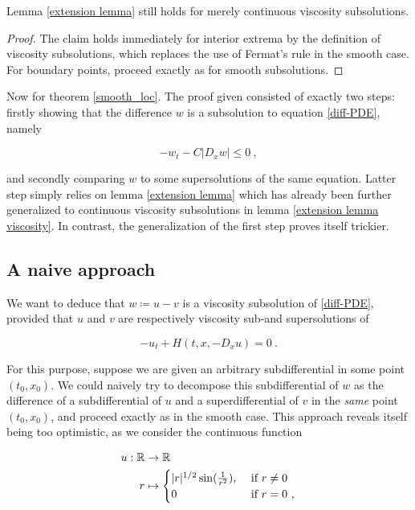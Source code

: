 	\begin{lemma}
		\label{extension lemma viscosity}
		Lemma \ref{extension lemma} still holds for merely continuous viscosity subsolutions.
		
		\begin{proof}
			The claim holds immediately for interior extrema by the definition of viscosity subsolutions, which replaces the use of Fermat's rule in the smooth case. For boundary points, proceed exactly as for smooth subsolutions.
		\end{proof}
	\end{lemma}

	Now for theorem \ref{smooth_loc}. The proof given consisted of exactly two steps: firstly showing that the difference $ w $ is a subsolution to equation \ref{diff-PDE}, namely
	
	\begin{equation*}
		-w_t - C \lvert D_x w \rvert \leq 0 \ ,
	\end{equation*}
	
	and secondly comparing $ w $ to some supersolutions of the same equation. Latter step simply relies on lemma \ref{extension lemma} which has already been further generalized to continuous viscosity subsolutions in lemma \ref{extension lemma viscosity}. In contrast, the generalization of the first step proves itself trickier. 

	\subsection{A naive approach}
		\label{naive}
		
		We want to deduce that $ w \coloneqq u - v $ is a viscosity subsolution of \ref{diff-PDE}, provided that $ u $ and $ v $ are respectively viscosity sub-and supersolutions of
		
		\begin{equation*}
				-u_t + H(t, x, -D_x u) = 0 \ .
		\end{equation*}
		
		For this purpose, suppose we are given an arbitrary subdifferential in some point $ (t_0, x_0) $. We could naively try to decompose this subdifferential of $ w $ as the difference of a subdifferential of $ u $ and a superdifferential of $ v $ in the \emph{same} point $ (t_0, x_0) $, and proceed exactly as in the smooth case. This approach reveals itself being too optimistic, as we consider the continuous function
		
		\begin{align*}
			u : \mathbb{R} &\to \mathbb{R} \\
			r &\mapsto \begin{cases}
			\lvert r \rvert^{1/2} \sin(\frac{1}{r^2}), &\hbox{ if } r \neq 0 \\
			0 &\hbox{ if } r = 0  \ ,
			\end{cases}
		\end{align*}
		
